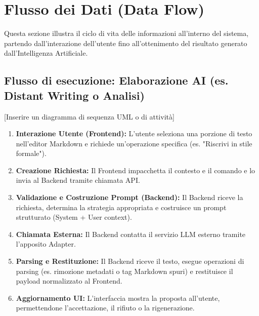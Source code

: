 \section{Flusso dei Dati (Data Flow)}
Questa sezione illustra il ciclo di vita delle informazioni all'interno del sistema, partendo dall'interazione dell'utente fino all'ottenimento del risultato generato dall'Intelligenza Artificiale.

\subsection{Flusso di esecuzione: Elaborazione AI (es. Distant Writing o Analisi)}
[Inserire un diagramma di sequenza UML o di attività]

\begin{enumerate}
    \item \textbf{Interazione Utente (Frontend):} L'utente seleziona una porzione di testo nell'editor Markdown e richiede un'operazione specifica (es. "Riscrivi in stile formale").
    \item \textbf{Creazione Richiesta:} Il Frontend impacchetta il contesto e il comando e lo invia al Backend tramite chiamata API.
    \item \textbf{Validazione e Costruzione Prompt (Backend):} Il Backend riceve la richiesta, determina la strategia appropriata e costruisce un prompt strutturato (System + User context).
    \item \textbf{Chiamata Esterna:} Il Backend contatta il servizio LLM esterno tramite l'apposito Adapter.
    \item \textbf{Parsing e Restituzione:} Il Backend riceve il testo, esegue operazioni di parsing (es. rimozione metadati o tag Markdown spuri) e restituisce il payload normalizzato al Frontend.
    \item \textbf{Aggiornamento UI:} L'interfaccia mostra la proposta all'utente, permettendone l'accettazione, il rifiuto o la rigenerazione.
\end{enumerate}
